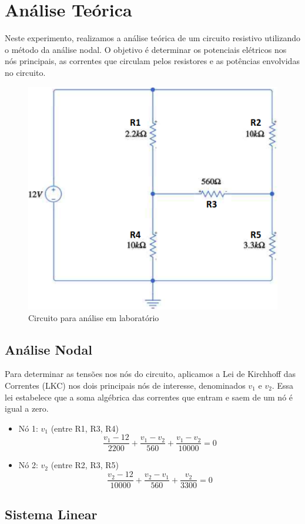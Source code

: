 \section{Análise Teórica}

Neste experimento, realizamos a análise teórica de um circuito resistivo
utilizando o método da análise nodal. O objetivo é determinar os potenciais
elétricos nos nós principais, as correntes que circulam pelos resistores e as
potências envolvidas no circuito.

\begin{figure}[H]
  \centering
  \includegraphics[width=0.5\linewidth]{fig/lab1circuit.png}
  \caption{Circuito para análise em laboratório}
  \label{fig:circuit}
\end{figure}

\subsection{Análise Nodal}

Para determinar as tensões nos nós do circuito, aplicamos a Lei de Kirchhoff das
Correntes (LKC) nos dois principais nós de interesse, denominados \(v_1\) e
\(v_2\). Essa lei estabelece que a soma algébrica das correntes que entram e
saem de um nó é igual a zero.

\begin{itemize}
  \item Nó 1: \(v_1\) (entre R1, R3, R4)
    \[
      \frac{v_1 - 12}{2200} + \frac{v_1 - v_2}{560} + \frac{v_1 - v_2}{10000} = 0
    \]
  \item Nó 2: \(v_2\) (entre R2, R3, R5)
    \[
      \frac{v_2 - 12}{10000} + \frac{v_2 - v_1}{560} + \frac{v_2}{3300} = 0
    \]
\end{itemize}

\subsection{Sistema Linear}

